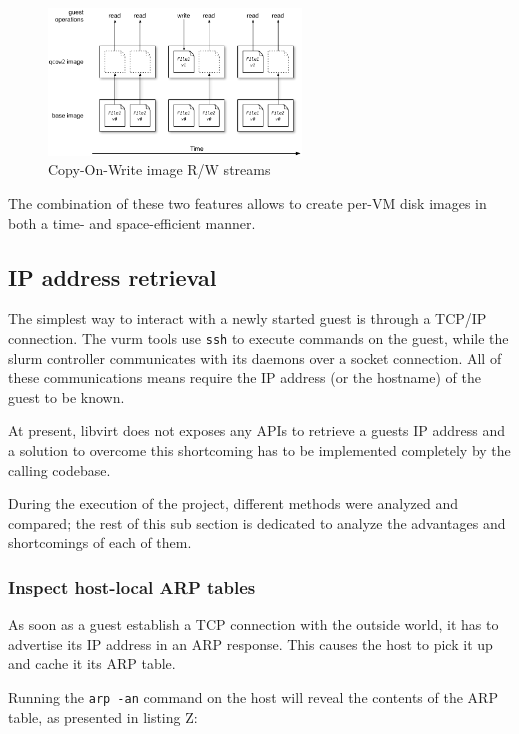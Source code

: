 \begin{figure}[h]
	\centering
	\includegraphics[width=0.6\textwidth]{figures/cow-images}
	\caption{Copy-On-Write image R/W streams}
	\label{fig:cow}
\end{figure}

The combination of these two features allows to create per-VM disk images in both a time- and space-efficient manner.

\subsection{IP address retrieval}

The simplest way to interact with a newly started guest is through a TCP/IP connection. The vurm tools use \texttt{ssh} to execute commands on the guest, while the slurm controller communicates with its daemons over a socket connection. All of these communications means require the IP address (or the hostname) of the guest to be known.

At present, libvirt does not exposes any APIs to retrieve a guests IP address and a solution to overcome this shortcoming has to be implemented completely by the calling codebase.

During the execution of the project, different methods were analyzed and compared; the rest of this sub section is dedicated to analyze the advantages and shortcomings of each of them.


\subsubsection{Inspect host-local ARP tables}

As soon as a guest establish a TCP connection with the outside world, it has to advertise its IP address in an ARP response. This causes the host to pick it up and cache it its ARP table.

Running the \texttt{arp -an} command on the host will reveal the contents of the ARP table, as presented in listing Z:

